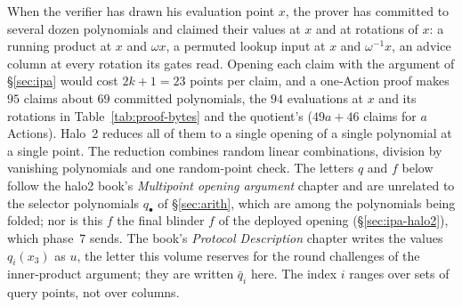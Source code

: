 \documentclass[11pt,a4paper]{article}
\theoremstyle{definition}
\begin{document}
When the verifier has drawn his evaluation point $x$, the prover has
committed to several dozen polynomials and claimed their values at $x$
and at rotations of $x$: a running product at $x$ and $\omega x$, a
permuted lookup input at $x$ and $\omega^{-1}x$, an advice column at
every rotation its gates read. Opening each claim with the argument of
\S\ref{sec:ipa} would cost $2k + 1 = 23$ points per claim, and a
one-Action proof makes $95$ claims about $69$ committed polynomials, the
$94$ evaluations at $x$ and its rotations in Table~\ref{tab:proof-bytes}
and the quotient's ($49a + 46$ claims for $a$ Actions). Halo~2 reduces
all of them to a single opening of a single polynomial at a single
point. The reduction
combines random linear combinations, division by vanishing polynomials
and one random-point check. The letters $q$ and $f$ below follow the
halo2 book's \emph{Multipoint opening argument} chapter and are unrelated
to the selector polynomials $q_\bullet$ of \S\ref{sec:arith}, which are
among the polynomials being folded; nor is this $f$ the final blinder $f$
of the deployed opening (\S\ref{sec:ipa-halo2}), which phase~7 sends. The
book's \emph{Protocol
Description} chapter writes the values $q_i(x_3)$ as $u$, the letter this
volume reserves for the round challenges of the inner-product argument;
they are written $\bar q_i$ here. The index $i$ ranges over sets of query
points, not over columns.
\end{document}
